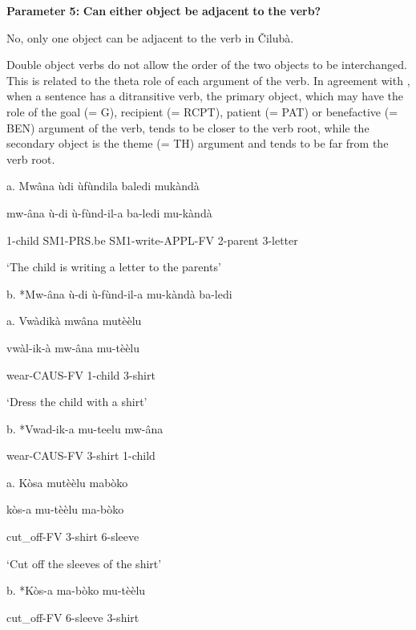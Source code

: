 \documentclass[output=paper]{langscibook}
\begin{document}
\textbf{Parameter} \textbf{5:} \textbf{Can} \textbf{either} \textbf{object} \textbf{be} \textbf{adjacent} \textbf{to} \textbf{the} \textbf{verb?}

No, only one object can be adjacent to the verb in Čilubà.

Double object verbs do not allow the order of the two objects to be interchanged. This is related to the theta role of each argument of the verb. In agreement with \citet{Riedel2009b}, when a sentence has a ditransitive verb, the primary object, which may have the role of the goal (= G), recipient (= RCPT), patient (= PAT) or benefactive (= BEN) argument of the verb, tends to be closer to the verb root, while the secondary object is the theme (= TH) argument and tends to be far from the verb root. 

\ea%
    \label{ex:lukusa:44}
    \z

           a.  Mwâna ùdi ùfùndila baledi mukàndà

mw-âna    ù-di           ù-fùnd-il-a           ba-ledi    mu-kàndà

1-child     SM1-PRS.be    SM1-write-APPL-FV    2-parent   3-letter

\glt ‘The child is writing a letter to the parents’

b.  *Mw-âna   ù-di     ù-fùnd-il-a     mu-kàndà   ba-ledi  

\ea%
    \label{ex:lukusa:45}
    \z

           a.  Vwàdikà       mwâna      mutèèlu

      vwàl-ik-à       mw-âna      mu-tèèlu

wear-CAUS-FV    1-child      3-shirt

\glt ‘Dress the child with a shirt’

    b.  *Vwad-ik-a       mu-teelu     mw-âna

  wear-CAUS-FV    3-shirt       1-child

\ea%
    \label{ex:lukusa:46}
    \z

         a.  Kòsa        mutèèlu      mabòko

      kòs-a        mu-tèèlu    ma-bòko

      cut\_off-FV    3-shirt      6-sleeve

\glt ‘Cut off the sleeves of the shirt’

    b. *Kòs-a       ma-bòko   mu-tèèlu  

        cut\_off-FV    6-sleeve    3-shirt

\ea%
    \label{ex:lukusa:47}
    \z
\end{document}
